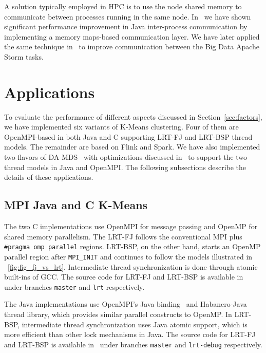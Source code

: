 \documentclass[10pt, conference, compsocconf]{IEEEtran}
\begin{document}
A solution typically employed in \ac{HPC} is to use the node shared memory to communicate between processes running in the same node. In~\cite{hpc2016:spidaljava} we have shown significant performance improvement in Java inter-process communication by implementing a memory maps-based communication layer. We have later applied the same technique in~\cite{kamburugamuve2016towards} to improve communication between the Big Data Apache Storm tasks.

\section{Applications} \label{sec:applications}
To evaluate the performance of different aspects discussed in Section~\ref{sec:factors}, we have implemented six variants of K-Means clustering. Four of them are OpenMPI-based in both Java and C supporting \ac{LRT-FJ} and \ac{LRT-BSP} thread models. The remainder are based on Flink and Spark. We have also implemented two flavors of \ac{DA-MDS}~\cite{Ruan:2013:RSS:2547685.2547700} with optimizations discussed in~\cite{hpc2016:spidaljava} to support the two thread models in Java and OpenMPI. The following subsections describe the details of these applications.

\subsection{\ac{MPI} Java and C K-Means}
The two C implementations use OpenMPI for message passing and OpenMP for shared memory parallelism. The \ac{LRT-FJ} follows the conventional \ac{MPI} plus \texttt{\#pragma omp parallel} regions. \ac{LRT-BSP}, on the other hand, starts an OpenMP parallel region after \texttt{MPI\_INIT} and continues to follow the models illustrated in \figurename~\ref{fig:fig_fj_vs_lrt}. Intermediate thread synchronization is done through atomic built-ins of \ac{GCC}. The source code for \ac{LRT-FJ} and \ac{LRT-BSP} is available in~\cite{mpi-c-kmeans} under branches \texttt{master} and \texttt{lrt} respectively.

The Java implementations use OpenMPI's Java binding~\cite{Vega-Gisbert:2013:TAJ:2488551.2488599,ompi-java-impl} and Habanero-Java~\cite{Imam:2014:HLJ:2647508.2647514} thread library, which provides similar parallel constructs to OpenMP. In \ac{LRT-BSP}, intermediate thread synchronization uses Java atomic support, which is more efficient than other lock mechanisms in Java. The source code for \ac{LRT-FJ} and \ac{LRT-BSP} is available in~\cite{mpi-java-kmeans} under branches \texttt{master} and \texttt{lrt-debug} respectively.
\end{document}
